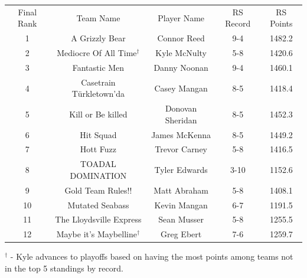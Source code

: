 \documentclass[11pt,letterpaper]{article}
\begin{document}
\vspace{-25pt}
\begin{table} [h]
\begin{center}
\begin{tabular} { c c c c c }
\\ Final Rank & Team Name & Player Name & RS Record & RS Points
\\ 1 & A Grizzly Bear & Connor Reed & 9-4 & 1482.2
\\ 2 & Mediocre Of All Time$^\dag$ & Kyle McNulty & 5-8 & 1420.6
\\ 3 & Fantastic Men & Danny Noonan & 9-4 & 1460.1
\\ 4 & Casetrain T\"{u}rkletown'da & Casey Mangan & 8-5 & 1418.4
\\ 5 & Kill or Be killed & Donovan Sheridan & 8-5 & 1452.3
\\ 6 & Hit Squad & James McKenna & 8-5 & 1449.2
\\ 7 & Hott Fuzz & Trevor Carney & 5-8 & 1416.5
\\ 8 & TOADAL DOMINATION & Tyler Edwards & 3-10 & 1152.6
\\ 9 & Gold Team Rules!! & Matt Abraham & 5-8 & 1408.1
\\ 10 & Mutated Seabass & Kevin Mangan & 6-7 & 1191.5
\\ 11 & The Lloydsville Express & Sean Musser & 5-8 & 1255.5
\\ 12 & Maybe it's Maybelline$^\dag$ & Greg Ebert & 7-6 & 1259.7
\end{tabular}
\end{center}
\noindent$^\dag$ - Kyle advances to playoffs based on having the most points among teams not in the top 5 standings by record.
\end{table}
\end{document}
